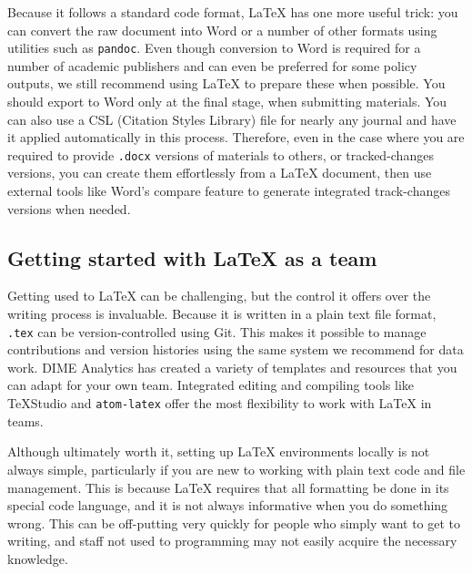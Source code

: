 Because it follows a standard code format,
{\LaTeX} has one more useful trick:
you can convert the raw document into Word
or a number of other formats
using utilities such as \texttt{pandoc}.
Even though conversion to Word is required
for a number of academic publishers and can even be preferred for some policy outputs,
we still recommend using {\LaTeX} to prepare these when possible.
You should export to Word only at the final stage, when submitting materials.
You can also use a CSL (Citation Styles Library) file
for nearly any journal and have it applied automatically in this process.
Therefore, even in the case where you are required to provide
\texttt{.docx} versions of materials to others, or tracked-changes versions,
you can create them effortlessly from a {\LaTeX} document,
then use external tools like Word's compare feature
to generate integrated track-changes versions when needed.

\subsection{Getting started with {\LaTeX} as a team}

Getting used to {\LaTeX} can be challenging,
but the control it offers over the writing process is invaluable.
Because it is written in a plain text file format,
\texttt{.tex} can be version-controlled using Git.
This makes it possible to manage contributions and version histories
using the same system we recommend for data work.
DIME Analytics has created a variety of templates and resources
that you can adapt for your own team.
Integrated editing and compiling tools like TeXStudio
and \texttt{atom-latex}
offer the most flexibility to work with {\LaTeX} in teams.

Although ultimately worth it, setting up {\LaTeX} environments locally is not always simple,
particularly if you are new to working with plain text code and file management.
This is because {\LaTeX} requires that all formatting be done in its special code language,
and it is not always informative when you do something wrong.
This can be off-putting very quickly for people
who simply want to get to writing,
and staff not used to programming may not easily acquire the necessary knowledge.

